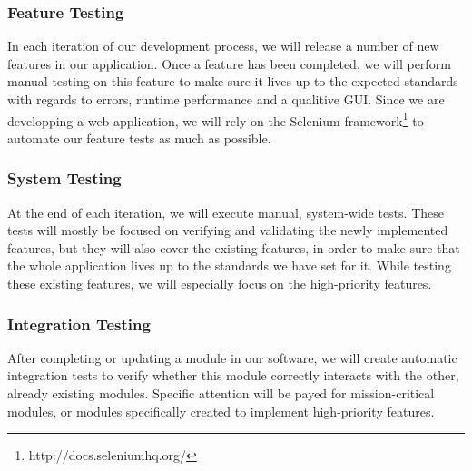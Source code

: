 \documentclass {article}
\begin{document}
\subsubsection*{Feature Testing}
In each iteration of our development process, we will release a number of new features in our application. Once a feature has been completed, we will perform manual testing on this feature to make sure it lives up to the expected standards with regards to errors, runtime performance and a qualitive GUI.
Since we are developping a web-application, we will rely on the Selenium framework\footnote{http://docs.seleniumhq.org/} to automate our feature tests as much as possible.

\subsubsection*{System Testing}
At the end of each iteration, we will execute manual, system-wide tests. These tests will mostly be focused on verifying and validating the newly implemented features, but they will also cover the existing features, in order to make sure that the whole application lives up to the standards we have set for it.
While testing these existing features, we will especially focus on the high-priority features.

\subsubsection*{Integration Testing}
After completing or updating a module in our software, we will create automatic integration tests to verify whether this module correctly interacts with the other, already existing modules. Specific attention will be payed for mission-critical modules, or modules specifically created to implement high-priority features.
\end{document}
